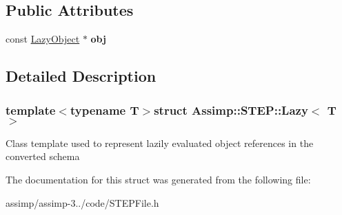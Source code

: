 \subsection*{Public Attributes}
\begin{DoxyCompactItemize}
\item 
\hypertarget{struct_assimp_1_1_s_t_e_p_1_1_lazy_ac3c518fcd721cc9f8f23c8775b560424}{const \hyperlink{class_assimp_1_1_s_t_e_p_1_1_lazy_object}{Lazy\+Object} $\ast$ {\bfseries obj}}\label{struct_assimp_1_1_s_t_e_p_1_1_lazy_ac3c518fcd721cc9f8f23c8775b560424}

\end{DoxyCompactItemize}


\subsection{Detailed Description}
\subsubsection*{template$<$typename T$>$struct Assimp\+::\+S\+T\+E\+P\+::\+Lazy$<$ T $>$}

Class template used to represent lazily evaluated object references in the converted schema 

The documentation for this struct was generated from the following file\+:\begin{DoxyCompactItemize}
\item 
assimp/assimp-\/3../code/S\+T\+E\+P\+File.\+h\end{DoxyCompactItemize}
